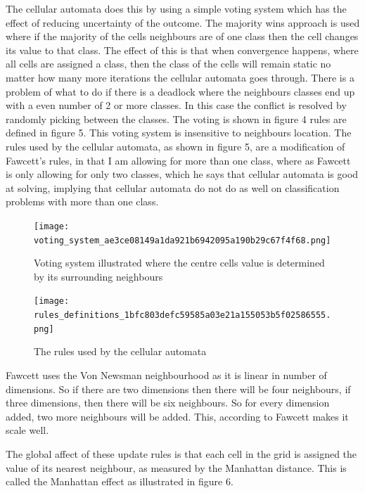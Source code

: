 \documentclass[11pt]{article}
\begin{document}
The cellular automata does this by using a simple voting system which
has the effect of reducing uncertainty of the outcome. The majority
wins approach is used where if the majority of the cells neighbours
are of one class then the cell changes its value to that class.  The
effect of this is that when convergence happens, where all cells are
assigned a class, then the class of the cells will remain static no
matter how many more iterations the cellular automata goes through.
There is a problem of what to do if there is a deadlock where the
neighbours classes end up with a even number of 2 or more classes.  In
this case the conflict is resolved by randomly picking between the
classes. The voting is shown in figure 4 rules are defined in
figure 5. This voting system is insensitive to neighbours location.
The rules used by the cellular automata, as shown in figure 5, are a
modification of Fawcett's \cite{fawcett08} rules, in that I am
allowing for more than one class, where as Fawcett \cite{fawcett08} is
only allowing for only two classes, which he says that cellular
automata is good at solving, implying that cellular automata do not do
as well on classification problems with more than one class.

\begin{figure}[htb]
\centering
\texttt{[image: voting\_system\_ae3ce08149a1da921b6942095a190b29c67f4f68.png]}
\caption{Voting system illustrated where the centre cells value is determined by its surrounding neighbours}
\end{figure}


\begin{figure}[htb]
\centering
\texttt{[image: rules\_definitions\_1bfc803defc59585a03e21a155053b5f02586555.png]}
\caption{The rules used by the cellular automata}
\end{figure}



Fawcett \cite{fawcett08} uses the Von Newsman neighbourhood as it is
linear in number of dimensions. So if there are two dimensions then
there will be four neighbours,  if three dimensions, then there will
be six neighbours.  So for every dimension added, two more neighbours
will be added.  This, according to Fawcett \cite{fawcett08} makes it
scale well.

The global affect of these update rules is that each cell in the grid
is assigned the value of its nearest neighbour, as measured by the
Manhattan distance.  This is called the Manhattan effect as
illustrated in figure 6.
\end{document}
